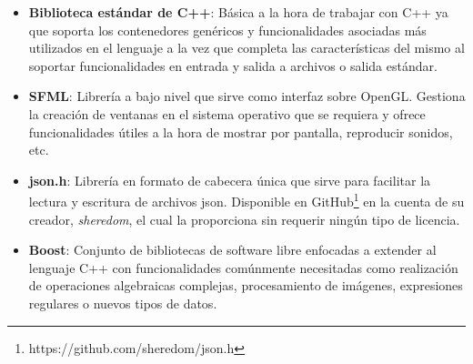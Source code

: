 \begin{itemize}
	\item \textbf{Biblioteca estándar de C++}: Básica a la hora de trabajar con C++ ya que soporta los contenedores genéricos y funcionalidades asociadas más utilizados en el lenguaje a la vez que completa las características del mismo al soportar funcionalidades en entrada y salida a archivos o salida estándar. 
	\item \textbf{SFML}: Librería a bajo nivel que sirve como interfaz sobre OpenGL. Gestiona la creación de ventanas en el sistema operativo que se requiera y ofrece funcionalidades útiles a la hora de mostrar por pantalla, reproducir sonidos, etc.
	\item \textbf{json.h}: Librería en formato de cabecera única que sirve para facilitar la lectura y escritura de archivos json. Disponible en GitHub\footnote{https://github.com/sheredom/json.h} en la cuenta de su creador, \textit{sheredom}, el cual la proporciona sin requerir ningún tipo de licencia.
	\item \textbf{Boost}: Conjunto de bibliotecas de software libre enfocadas a extender al lenguaje C++ con funcionalidades comúnmente necesitadas como realización de operaciones algebraicas complejas, procesamiento de imágenes, expresiones regulares o nuevos tipos de datos.
\end{itemize}

